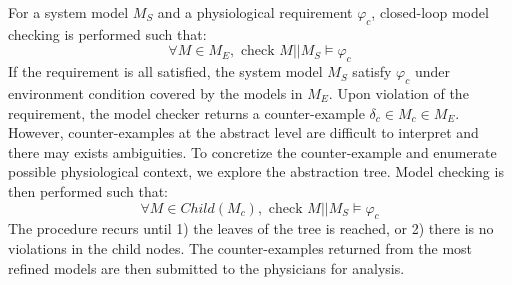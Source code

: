 For a system model $M_S$ and a physiological requirement $\varphi_c$, closed-loop model checking is performed such that:
$$\forall M\in M_E, \text{ check } M||M_S\models\varphi_c$$
If the requirement is all satisfied, the system model $M_S$ satisfy $\varphi_c$ under environment condition covered by the models in $M_E$. Upon violation of the requirement, the model checker returns a counter-example $\delta_c\in M_c\in M_E$. However, counter-examples at the abstract level are difficult to interpret and there may exists ambiguities. To concretize the counter-example and enumerate possible physiological context, we explore the abstraction tree. Model checking is then performed such that:
$$\forall M\in Child(M_c), \text{ check } M||M_S\models\varphi_c$$  
The procedure recurs until 1) the leaves of the tree is reached, or 2) there is no violations in the child nodes. The counter-examples returned from the most refined models are then submitted to the physicians for analysis. 




